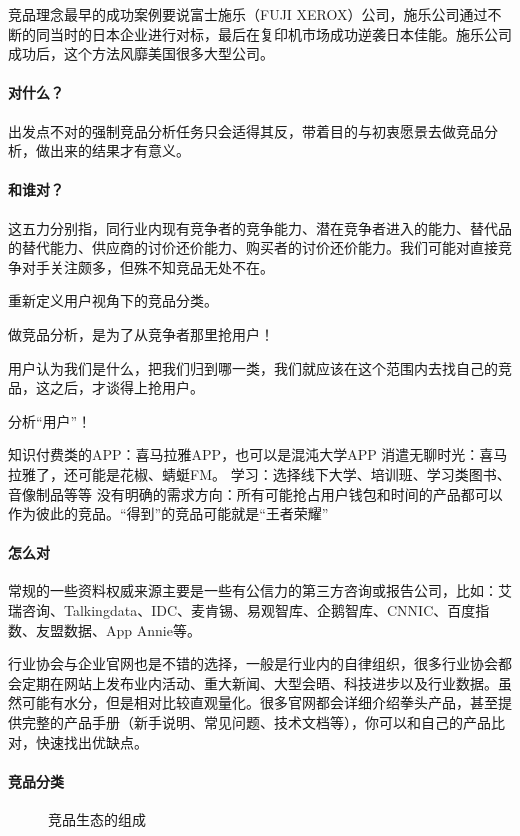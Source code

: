 \documentclass[letterpaper,11pt,english]{sphinxmanual}
\begin{document}
竞品理念最早的成功案例要说富士施乐（FUJI
XEROX）公司，施乐公司通过不断的同当时的日本企业进行对标，最后在复印机市场成功逆袭日本佳能。施乐公司成功后，这个方法风靡美国很多大型公司。


\paragraph{对什么？}
\label{\detokenize{chapter_skill/goods_analysis:id10}}
出发点不对的强制竞品分析任务只会适得其反，带着目的与初衷愿景去做竞品分析，做出来的结果才有意义。


\paragraph{和谁对？}
\label{\detokenize{chapter_skill/goods_analysis:id11}}
这五力分别指，同行业内现有竞争者的竞争能力、潜在竞争者进入的能力、替代品的替代能力、供应商的讨价还价能力、购买者的讨价还价能力。我们可能对直接竞争对手关注颇多，但殊不知竞品无处不在。

重新定义用户视角下的竞品分类。

做竞品分析，是为了从竞争者那里抢用户！

用户认为我们是什么，把我们归到哪一类，我们就应该在这个范围内去找自己的竞品，这之后，才谈得上抢用户。

分析“用户”！

知识付费类的APP：喜马拉雅APP，也可以是混沌大学APP
消遣无聊时光：喜马拉雅了，还可能是花椒、蜻蜓FM。
学习：选择线下大学、培训班、学习类图书、音像制品等等
没有明确的需求方向：所有可能抢占用户钱包和时间的产品都可以作为彼此的竞品。“得到”的竞品可能就是“王者荣耀”


\paragraph{怎么对}
\label{\detokenize{chapter_skill/goods_analysis:id12}}
常规的一些资料权威来源主要是一些有公信力的第三方咨询或报告公司，比如：艾瑞咨询、Talkingdata、IDC、麦肯锡、易观智库、企鹅智库、CNNIC、百度指数、友盟数据、App
Annie等。

行业协会与企业官网也是不错的选择，一般是行业内的自律组织，很多行业协会都会定期在网站上发布业内活动、重大新闻、大型会晤、科技进步以及行业数据。虽然可能有水分，但是相对比较直观量化。很多官网都会详细介绍拳头产品，甚至提供完整的产品手册（新手说明、常见问题、技术文档等），你可以和自己的产品比对，快速找出优缺点。


\paragraph{竞品分类}
\label{\detokenize{chapter_skill/goods_analysis:id13}}
\begin{figure}[H]
\centering
\capstart

\noindent{}
\caption{竞品生态的组成}\label{\detokenize{chapter_skill/goods_analysis:id19}}\end{figure}
\end{document}
